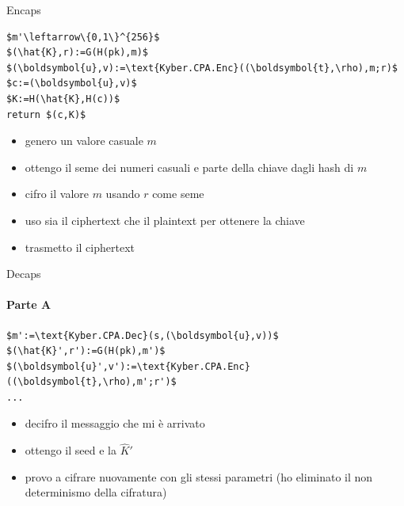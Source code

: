     \begin{frame}[fragile]{Encaps}
\begin{minipage}{0.45\linewidth}
    \begin{lstlisting}[title=Kyber.Encaps(pk):,mathescape=true]
$m'\leftarrow\{0,1\}^{256}$
$(\hat{K},r):=G(H(pk),m)$
$(\boldsymbol{u},v):=\text{Kyber.CPA.Enc}((\boldsymbol{t},\rho),m;r)$
$c:=(\boldsymbol{u},v)$
$K:=H(\hat{K},H(c))$
return $(c,K)$
        \end{lstlisting}
    \end{minipage}\hfill
    \begin{minipage}{0.5\linewidth}
        \begin{itemize}%
            \item genero un valore casuale $m$
            \item ottengo il seme dei numeri casuali e parte della chiave dagli hash di $m$
            \item cifro il valore $m$ usando $r$ come seme
            \item uso sia il ciphertext che il plaintext per ottenere la chiave
            \item trasmetto il ciphertext            
        \end{itemize}
    \end{minipage}
    \end{frame}

        \begin{frame}[fragile]{Decaps}
            \framesubtitle{Parte A}
\begin{minipage}{0.45\linewidth}
    \begin{lstlisting}[title=Kyber.Decaps(sk\,z\,c):,mathescape=true]
$m':=\text{Kyber.CPA.Dec}(s,(\boldsymbol{u},v))$
$(\hat{K}',r'):=G(H(pk),m')$
$(\boldsymbol{u}',v'):=\text{Kyber.CPA.Enc}((\boldsymbol{t},\rho),m';r')$
...
        \end{lstlisting}
    \end{minipage}\hfill
    \begin{minipage}{0.5\linewidth}
        \begin{itemize}%
            \item decifro il messaggio che mi è arrivato
            \item ottengo il seed e la $\hat{K}'$
            \item provo a cifrare nuovamente con gli stessi parametri (ho eliminato il non determinismo della cifratura)
        \end{itemize}
    \end{minipage}
        \end{frame}


